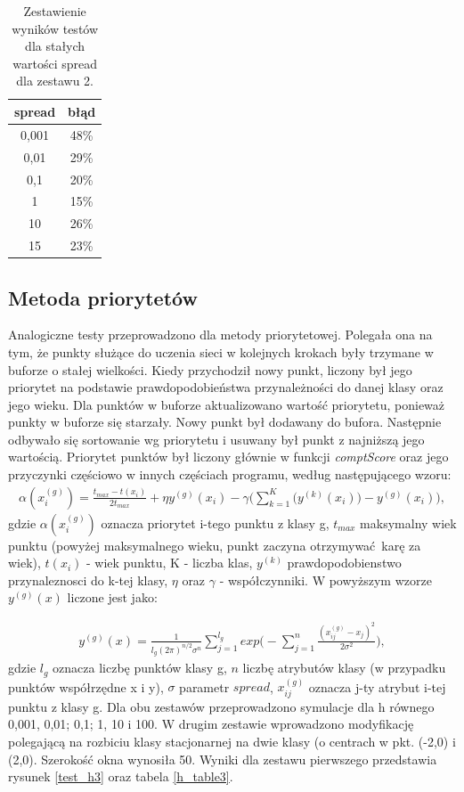 \documentclass[10pt,a4paper]{article}
\begin{document}
\begin{table}[H]
\centering
\begin{tabular}{|c|c|}
\hline
spread & błąd \\
\hline
0,001 & 48\%  \\
\hline
0,01 & 29\%  \\
\hline
0,1 & 20\%  \\
\hline
1 & 15\%  \\
\hline
10 & 26\%  \\
\hline
15 & 23\%  \\
\hline
\end{tabular}
\caption{Zestawienie wyników testów dla stałych wartości spread dla zestawu 2.}
\label{h_table2}
\end{table}

\subsection{Metoda priorytetów}
Analogiczne testy przeprowadzono dla metody priorytetowej. Polegała ona na tym, że punkty służące do uczenia sieci w kolejnych krokach były trzymane w buforze o stałej wielkości. Kiedy przychodził nowy punkt, liczony był jego priorytet na podstawie prawdopodobieństwa przynależności do danej klasy oraz jego wieku. Dla punktów w buforze aktualizowano wartość priorytetu, ponieważ punkty w buforze się starzały. Nowy punkt był dodawany do bufora. Następnie odbywało się sortowanie wg priorytetu i usuwany był punkt z najniższą jego wartością. Priorytet punktów był liczony głównie w funkcji \textit{comptScore} oraz jego przyczynki częściowo w innych częściach programu, według następującego wzoru:
\begin{gather}
	\alpha(x_{i}^{(g)}) = \frac{t_{max} - t(x_i)}{2t_{max}} + \eta y^{(g)}(x_i) - \gamma \Bigg( \sum_{k=1}^K\Big(y^{(k)}(x_i)\Big) -y^{(g)}(x_i) \Bigg),
\end{gather}
gdzie $\alpha(x_{i}^{(g)})$ oznacza priorytet i-tego punktu z klasy g, $t_{max}$ maksymalny wiek punktu (powyżej maksymalnego wieku, punkt zaczyna otrzymywać karę za wiek), $t(x_i)$ - wiek  punktu, K - liczba klas, $y^{(k)}$ prawdopodobienstwo przynaleznosci do k-tej klasy, $\eta$ oraz $\gamma$ - współczynniki. W powyższym wzorze $y^{(g)}(x)$ liczone jest jako:


\begin{gather}
	y^{(g)}(x) = \frac{1}{l_g(2\pi)^{n/2}\sigma^n}  \sum_{j=1}^{l_g}exp\Bigg(-\sum_{j=1}^n\frac{(x_{ij}^{(g)} - x_j)^2}{2\sigma^2} \Bigg),
\end{gather}
gdzie $l_g$ oznacza liczbę punktów klasy g, $n$ liczbę atrybutów klasy (w przypadku punktów współrzędne x i y), $\sigma$ parametr $spread$, $x_{ij}^{(g)}$ oznacza j-ty atrybut i-tej punktu z klasy g. 
Dla obu zestawów przeprowadzono symulacje dla h równego 0,001, 0,01; 0,1; 1, 10 i 100. W drugim zestawie wprowadzono modyfikację polegającą na rozbiciu klasy stacjonarnej na dwie klasy (o centrach w pkt. (-2,0) i (2,0). Szerokość okna wynosiła 50. Wyniki dla zestawu pierwszego przedstawia rysunek \ref{test_h3} oraz tabela \ref{h_table3}.
\end{document}
